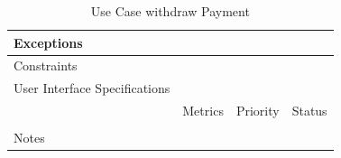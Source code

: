 \begin{table}[H]
\begin{tabularx}{\linewidth}{|l|X|X|X|}
            \hline Exceptions                    & \multicolumn{3}{l|}{}                                                                                 \\

            \hline Constraints                   & \multicolumn{3}{l|}{}                                                                                 \\

            \hline User Interface Specifications & \multicolumn{3}{l|}{}                                                                                 \\

            \hline \multirow{2}{*}{}             & Metrics                                                                           & Priority & Status \\
            \cline{2-4}                          &                                                                                   &          &        \\
            \hline Notes                         & \multicolumn{3}{l|}{}                                                                                 \\
            \hline
      \end{tabularx}
      \caption{Use Case withdraw Payment}
      \label{tab:use_case_withdraw_payment}
\end{table}

